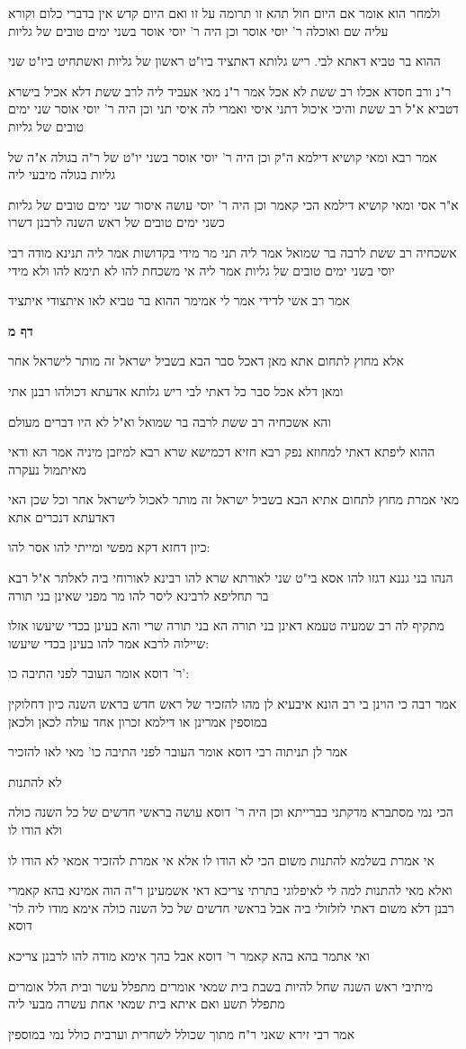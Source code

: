\documentclass[12pt, openany]{book}
\newcommand{\sethebfont}{
\fontsize{10.5pt}{21.0pt} \selectfont
}
\newcommand{\textblock}[1]{
{\sethebfont #1\\}	
}
\newcommand{\sectname}{}
\newcommand{\newsection}[1]{
	\addcontentsline{toc}{section}{#1}
	\renewcommand{\sectname}{#1}	
	\vspace{-\baselineskip}
	\begin{center}
		\textbf{%
\fontsize{16pt}{16pt}\selectfont
			#1}
	\end{center}
	\vspace{-\baselineskip}
	\nopagebreak
}
\begin{document}
\textblock{ולמחר הוא אומר אם היום חול תהא זו תרומה על זו ואם היום קדש אין בדברי כלום וקורא עליה שם ואוכלה ר' יוסי אוסר וכן היה ר' יוסי אוסר בשני ימים טובים של גליות}
\textblock{ההוא בר טביא דאתא לבי. ריש גלותא דאתציד ביו"ט ראשון של גליות ואשתחיט ביו"ט שני}
\textblock{ר"נ ורב חסדא אכלו רב ששת לא אכל אמר ר"נ מאי אעביד ליה לרב ששת דלא אכיל בישרא דטביא א"ל רב ששת והיכי איכול דתני איסי ואמרי לה איסי תני וכן היה ר' יוסי אוסר שני ימים טובים של גליות}
\textblock{אמר רבא ומאי קושיא דילמא ה"ק וכן היה ר' יוסי אוסר בשני יו"ט של ר"ה בגולה א"ה של גליות בגולה מיבעי ליה}
\textblock{א"ר אסי ומאי קושיא דילמא הכי קאמר וכן היה ר' יוסי עושה איסור שני ימים טובים של גליות כשני ימים טובים של ראש השנה לרבנן דשרו}
\textblock{אשכחיה רב ששת לרבה בר שמואל אמר ליה תני מר מידי בקדושות אמר ליה תנינא מודה רבי יוסי בשני ימים טובים של גליות אמר ליה אי משכחת להו לא תימא להו ולא מידי}
\textblock{אמר רב אשי לדידי אמר לי אמימר ההוא בר טביא לאו איתצודי איתציד}
\newsection{דף מ}
\textblock{אלא מחוץ לתחום אתא מאן דאכל סבר הבא בשביל ישראל זה מותר לישראל אחר}
\textblock{ומאן דלא אכל סבר כל דאתי לבי ריש גלותא אדעתא דכולהו רבנן אתי}
\textblock{והא אשכחיה רב ששת לרבה בר שמואל וא"ל לא היו דברים מעולם}
\textblock{ההוא ליפתא דאתי למחוזא נפק רבא חזיא דכמישא שרא רבא למיזבן מיניה אמר הא ודאי מאיתמול נעקרה}
\textblock{מאי אמרת מחוץ לתחום אתיא הבא בשביל ישראל זה מותר לאכול לישראל אחר וכל שכן האי דאדעתא דנכרים אתא}
\textblock{כיון דחזא דקא מפשי ומייתי להו אסר להו:}
\textblock{הנהו בני גננא דגזו להו אסא בי"ט שני לאורתא שרא להו רבינא לאורוחי ביה לאלתר א"ל רבא בר תחליפא לרבינא ליסר להו מר מפני שאינן בני תורה}
\textblock{מתקיף לה רב שמעיה טעמא דאינן בני תורה הא בני תורה שרי והא בעינן בכדי שיעשו אזלו שיילוה לרבא אמר להו בעינן בכדי שיעשו:}
\textblock{ר' דוסא אומר העובר לפני התיבה כו':}
\textblock{אמר רבה כי הוינן בי רב הונא איבעיא לן מהו להזכיר של ראש חדש בראש השנה כיון דחלוקין במוספין אמרינן או דילמא זכרון אחד עולה לכאן ולכאן}
\textblock{אמר לן תניתוה רבי דוסא אומר העובר לפני התיבה כו' מאי לאו להזכיר}
\textblock{לא להתנות}
\textblock{הכי נמי מסתברא מדקתני בברייתא וכן היה ר' דוסא עושה בראשי חדשים של כל השנה כולה ולא הודו לו}
\textblock{אי אמרת בשלמא להתנות משום הכי לא הודו לו אלא אי אמרת להזכיר אמאי לא הודו לו}
\textblock{ואלא מאי להתנות למה לי לאיפלוגי בתרתי צריכא דאי אשמעינן ר"ה הוה אמינא בהא קאמרי רבנן דלא משום דאתי לזלזולי ביה אבל בראשי חדשים של כל השנה כולה אימא מודו ליה לר' דוסא}
\textblock{ואי אתמר בהא בהא קאמר ר' דוסא אבל בהך אימא מודה להו לרבנן צריכא}
\textblock{מיתיבי ראש השנה שחל להיות בשבת בית שמאי אומרים מתפלל עשר ובית הלל אומרים מתפלל תשע ואם איתא בית שמאי אחת עשרה מבעי ליה}
\textblock{אמר רבי זירא שאני ר"ח מתוך שכולל לשחרית וערבית כולל נמי במוספין}
\end{document}
